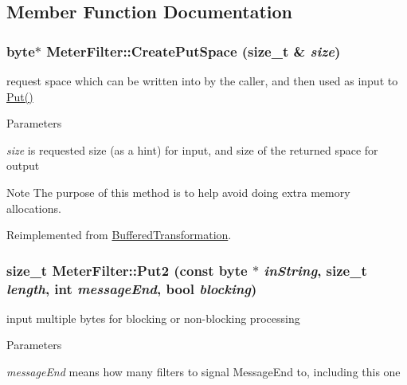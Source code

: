 \subsection{Member Function Documentation}
\hypertarget{class_meter_filter_a49d92192dcbd3366ff0576159ea62e9d}{
\subsubsection[{CreatePutSpace}]{\setlength{\rightskip}{0pt plus 5cm}byte$\ast$ MeterFilter::CreatePutSpace (size\_\-t \& {\em size})}}
\label{class_meter_filter_a49d92192dcbd3366ff0576159ea62e9d}


request space which can be written into by the caller, and then used as input to \hyperlink{class_buffered_transformation_ae70658b0d271f8e114ac6c3cc9774ede}{Put()} 
\begin{DoxyParams}{Parameters}
\item[{\em size}]is requested size (as a hint) for input, and size of the returned space for output\end{DoxyParams}
\begin{DoxyNote}{Note}
The purpose of this method is to help avoid doing extra memory allocations. 
\end{DoxyNote}


Reimplemented from \hyperlink{class_buffered_transformation_af390325c959c3d6a2c03a447d6cd469d}{BufferedTransformation}.\hypertarget{class_meter_filter_ac85bac20a08666c434751558ec7b6c92}{
\subsubsection[{Put2}]{\setlength{\rightskip}{0pt plus 5cm}size\_\-t MeterFilter::Put2 (const byte $\ast$ {\em inString}, \/  size\_\-t {\em length}, \/  int {\em messageEnd}, \/  bool {\em blocking})}}
\label{class_meter_filter_ac85bac20a08666c434751558ec7b6c92}


input multiple bytes for blocking or non-\/blocking processing 
\begin{DoxyParams}{Parameters}
\item[{\em messageEnd}]means how many filters to signal MessageEnd to, including this one \end{DoxyParams}


